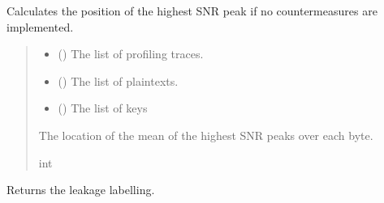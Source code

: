 \documentclass[letterpaper,10pt,english]{sphinxmanual}
\begin{document}
\begin{fulllineitems}
\begin{fulllineitems}
\label{\detokenize{MLSCAlib.Ciphers:MLSCAlib.Ciphers.leakage_model.LeakageModel.get_snr_poi}}
\pysigstartsignatures
{}
\pysigstopsignatures
\sphinxAtStartPar
Calculates the position of the highest SNR peak if no countermeasures are implemented.
\begin{quote}\begin{description}
\begin{itemize}
\item {} 
\sphinxAtStartPar
{} () \textendash{} The list of profiling traces.

\item {} 
\sphinxAtStartPar
{} () \textendash{} The list of plaintexts.

\item {} 
\sphinxAtStartPar
{} () \textendash{} The list of keys

\end{itemize}

\sphinxAtStartPar
The location of the mean of the highest SNR peaks over each byte.

\sphinxAtStartPar
int

\end{description}\end{quote}

\end{fulllineitems}


\begin{fulllineitems}
\label{\detokenize{MLSCAlib.Ciphers:MLSCAlib.Ciphers.leakage_model.LeakageModel.get_type}}
\pysigstartsignatures
{}
\pysigstopsignatures
\sphinxAtStartPar
Returns the leakage labelling.


\end{fulllineitems}
\end{fulllineitems}
\end{document}
